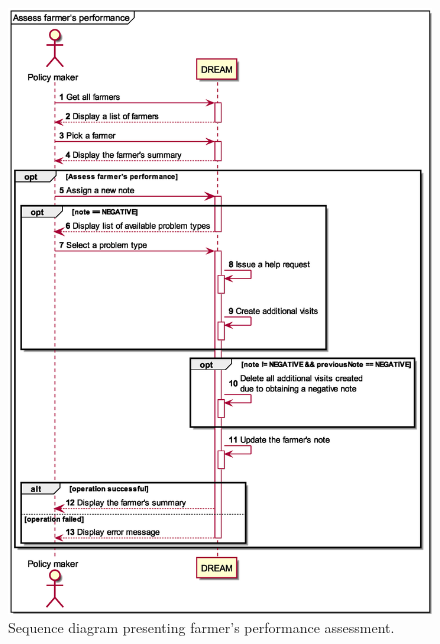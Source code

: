 \begin{figure}[H]
    \centering
    \includegraphics[scale=0.6, keepaspectratio, origin=c]{diagrams/sequence/assess_farmers_performance}
    \caption{Sequence diagram presenting farmer's performance assessment.}
    \label{fig:sd_assess_farmers_performance}
\end{figure}


